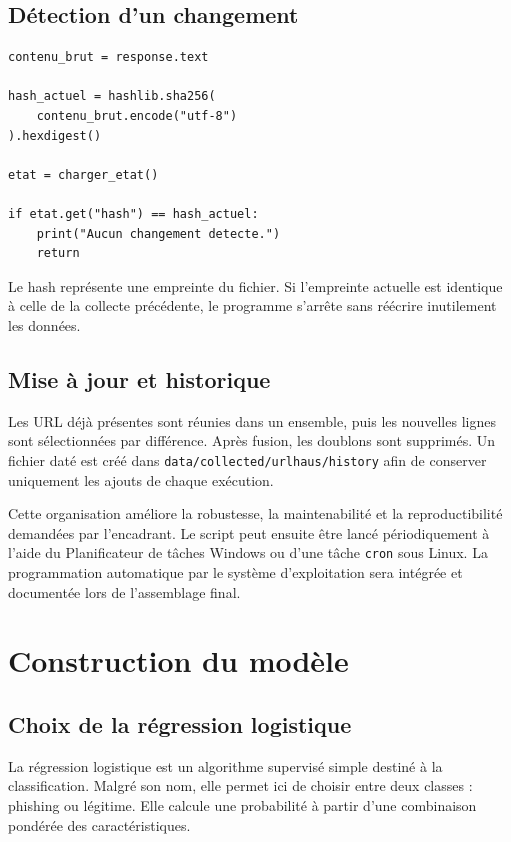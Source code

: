 \documentclass[11pt,a4paper]{report}
\begin{document}
\section{Détection d'un changement}

\begin{lstlisting}[caption={Vérification du contenu téléchargé}]
contenu_brut = response.text

hash_actuel = hashlib.sha256(
    contenu_brut.encode("utf-8")
).hexdigest()

etat = charger_etat()

if etat.get("hash") == hash_actuel:
    print("Aucun changement detecte.")
    return
\end{lstlisting}

Le hash représente une empreinte du fichier. Si l'empreinte actuelle est
identique à celle de la collecte précédente, le programme s'arrête sans
réécrire inutilement les données.

\section{Mise à jour et historique}

Les URL déjà présentes sont réunies dans un ensemble, puis les nouvelles
lignes sont sélectionnées par différence. Après fusion, les doublons sont
supprimés. Un fichier daté est créé dans
\texttt{data/collected/urlhaus/history} afin de conserver uniquement les ajouts de
chaque exécution.

Cette organisation améliore la robustesse, la maintenabilité et la
reproductibilité demandées par l'encadrant. Le script peut ensuite être lancé
périodiquement à l'aide du Planificateur de tâches Windows ou d'une tâche
\texttt{cron} sous Linux. La programmation automatique par le système
d'exploitation sera intégrée et documentée lors de l'assemblage final.

\chapter{Construction du modèle}

\section{Choix de la régression logistique}

La régression logistique est un algorithme supervisé simple destiné à la
classification. Malgré son nom, elle permet ici de choisir entre deux classes :
phishing ou légitime. Elle calcule une probabilité à partir d'une combinaison
pondérée des caractéristiques.
\end{document}
